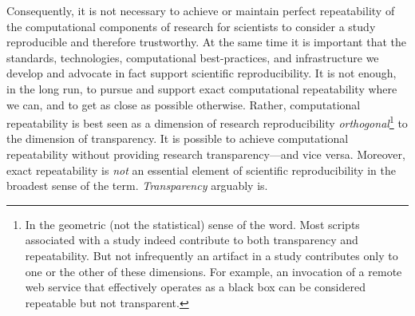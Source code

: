 Consequently, it is not necessary to achieve or 
	maintain perfect repeatability of the computational components of research for scientists to 
	consider a study reproducible and therefore trustworthy.
At the same time it is important that the standards, technologies, 
	computational best-practices, and infrastructure we develop and advocate in fact support scientific reproducibility.
It is not enough, in the long run, to pursue and support exact computational repeatability where we can, 
	and to get as close as possible otherwise.
Rather, computational repeatability is best seen as a dimension of research reproducibility 
	\emph{orthogonal}\footnote{In the geometric (not the statistical) sense of the word.
	Most scripts associated with a study indeed contribute to both transparency and repeatability.  But not 
	infrequently an artifact in a study contributes only to one or the other
	of these dimensions. For example, an invocation of a
	remote web service that effectively operates as a black box can be considered repeatable but not transparent.}
	to the dimension of transparency.
It is possible to achieve computational repeatability without providing research transparency---and vice versa.
Moreover, exact repeatability is \emph{not} an essential element of
scientific reproducibility in the broadest sense of the term. \emph{Transparency} arguably is.


